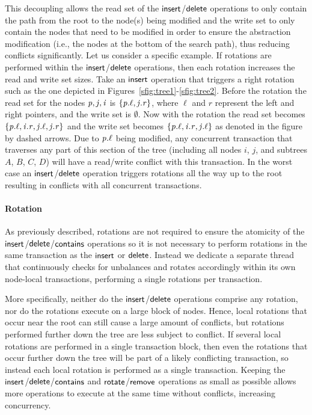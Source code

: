 This decoupling allows the read set of the $\act{insert}$/$\lit{delete}$ operations to only contain the path from the root to the node(s) being modified and the write set to only contain
the nodes that need to be modified in order to ensure the abstraction modification (i.e., the nodes at the bottom of the search path), thus reducing conflicts significantly.
Let us consider a specific example.
If rotations are performed within the $\act{insert}$/$\act{delete}$ operations, then each rotation increases the read and write set sizes.
Take an $\act{insert}$ operation that triggers a right rotation such as the one depicted in Figures~\ref{sfig:tree1}-\ref{sfig:tree2}.
Before the rotation the read set for the nodes $\ms{p},\ms{j},\ms{i}$ is $\{\ms{p.\ell}, \ms{j.r}\}$, where $\ell$ and $r$ represent the left and right pointers, and the write set is $\emptyset$.
Now with the rotation the read set becomes $\{\ms{p.\ell}, \ms{i.r}, \ms{j.\ell}, \ms{j.r}\}$ and the write set becomes $\{\ms{p.\ell}, \ms{i.r}, \ms{j.\ell}\}$
as denoted in the figure by dashed arrows.
Due to $\ms{p.\ell}$ being modified, any concurrent transaction that traverses any part of this section of the tree (including all nodes $i$, $j$, and subtrees $A$, $B$, $C$, $D$)
will have a read/write conflict with this transaction.
In the worst case an $\act{insert}$/$\act{delete}$ operation triggers rotations all the way up to the root resulting in conflicts with all concurrent transactions.

\paragraph{Rotation}



As previously described, rotations are not required to ensure the atomicity of the $\act{insert}$/$\act{delete}$/$\act{contains}$ operations
so it is not necessary to perform rotations in the same transaction as the $\act{insert}$ or $\act{delete}$.
Instead we dedicate a separate thread that continuously checks for unbalances and rotates accordingly within its own node-local transactions,
performing a single rotations per transaction.

More specifically, neither do the $\act{insert}$/$\act{delete}$ operations comprise any rotation, nor do the rotations execute
on a large block of nodes. Hence, local
rotations that occur near the root can still cause a large amount of conflicts, but rotations performed further down the tree are less subject to conflict.
If several local rotations are performed in a single transaction block, then even the rotations that occur further down the tree will be part of a likely conflicting transaction, 
so instead each local rotation is performed as a single transaction.
Keeping the $\act{insert}$/$\act{delete}$/$\act{contains}$ and $\act{rotate}$/$\act{remove}$ operations as small as possible allows more operations to execute at the same time without conflicts, increasing concurrency.

